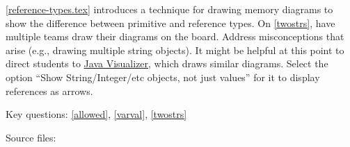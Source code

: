 \documentclass[12pt]{article}
\begin{document}
{\ref{reference-types.tex} introduces a technique for drawing memory diagrams to show the difference between primitive and reference types.
On \ref{twostrs}, have multiple teams draw their diagrams on the board.
Address misconceptions that arise (e.g., drawing multiple string objects).
It might be helpful at this point to direct students to \href{https://cscircles.cemc.uwaterloo.ca/java_visualize/}{Java Visualizer}, which draws similar diagrams.
Select the option ``Show String/Integer/etc objects, not just values'' for it to display references as arrows.

Key questions: \ref{allowed}, \ref{varval}, \ref{twostrs}

Source files: 
}


\newpage

\newpage

\end{document}
